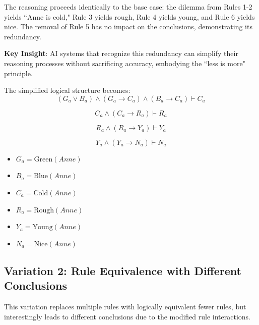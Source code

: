 \documentclass{article}
\begin{document}
The reasoning proceeds identically to the base case: the dilemma from Rules 1-2 yields ``Anne is cold," Rule 3 yields rough, Rule 4 yields young, and Rule 6 yields nice. The removal of Rule 5 has no impact on the conclusions, demonstrating its redundancy.

\textbf{Key Insight}: AI systems that recognize this redundancy can simplify their reasoning processes without sacrificing accuracy, embodying the ``less is more" principle.

The simplified logical structure becomes:
\[
(G_a \lor B_a) \land (G_a \rightarrow C_a) \land (B_a \rightarrow C_a) \vdash C_a
\]

\[
C_a \land (C_a \rightarrow R_a) \vdash R_a
\]


\[
R_a \land (R_a \rightarrow Y_a) \vdash Y_a
\]


\[
Y_a \land (Y_a \rightarrow N_a) \vdash N_a
\]

\begin{itemize}
    \item $G_a = \mathrm{Green}(Anne)$
    \item $B_a = \mathrm{Blue}(Anne)$
    \item $C_a = \mathrm{Cold}(Anne)$
    \item $R_a = \mathrm{Rough}(Anne)$
    \item $Y_a = \mathrm{Young}(Anne)$
    \item $N_a = \mathrm{Nice}(Anne)$
\end{itemize}


\subsection{Variation 2: Rule Equivalence with Different Conclusions}

This variation replaces multiple rules with logically equivalent fewer rules, but interestingly leads to different conclusions due to the modified rule interactions.
\end{document}
